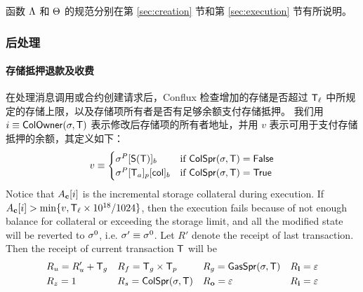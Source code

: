 函数 $\mathrm{\Lambda}$ 和 $\mathrm{\Theta}$ 的规范分别在第 \ref{sec:creation} 节和第 \ref{sec:execution} 节有所说明。

\subsubsection{后处理}\label{sec:tx_post_process}

\paragraph{存储抵押退款及收费}

在处理消息调用或合约创建请求后，Conflux 检查增加的存储是否超过 $\textsf{T}_\ell$ 中所规定的存储上限，以及存储项所有者是否有足够余额支付存储抵押。
我们用 $i\equiv \mathsf{ColOwner}(\mathbf{\sigma},\textsf{T})$ 表示修改后存储项的所有者地址，并用 $v$ 表示可用于支付存储抵押的余额，其定义如下：
\begin{align}
	v \equiv \begin{cases}
		\mathbf{\sigma}^{P}[\mathsf{S}{\left({\textsf{T}} \right)}]_b & \text{if }\mathsf{ColSpr}(\mathbf{\sigma},\textsf{T})=\mathsf{False} \\
		\mathbf{\sigma}^{P}[\textsf{T}_a]_p[{\sf col}]_b &  \text{if }\mathsf{ColSpr}(\mathbf{\sigma},\textsf{T})=\mathsf{True}
	\end{cases}
\end{align}
%
Notice that $A_{\bf c}[i]$ is the incremental storage collateral during execution.
If $A_{\bf c}[i]>\min\{v,\textsf{T}_\ell\times 10^{18}/1024\}$, then the execution fails because of not enough balance for collateral or exceeding the storage limit, 
and all the modified state will be reverted to $\mathbf{\sigma}^0$, 
i.e. $\mathbf{\sigma}'\equiv\mathbf{\sigma}^0$. 
Let $R'$ denote the receipt of last transaction.
Then the receipt of current transaction $\textsf{T}$ will be 
\begin{align}
	&R_u=R'_u+\textsf{T}_g && R_f = \textsf{T}_g\times\textsf{T}_p && R_g = \mathsf{GasSpr}(\mathbf{\sigma},\textsf{T}) && R_{\bf l}=\mathbb{\varepsilon} \\
	&R_z=1 && R_s = \mathsf{ColSpr}(\mathbf{\sigma},\textsf{T}) && R_{\bf o}=\mathbb{\varepsilon} && R_{\bf i}=\mathbb{\varepsilon}
\end{align}

